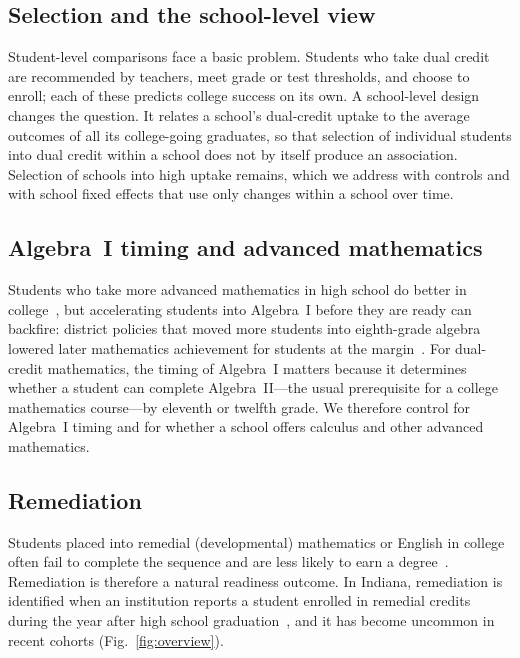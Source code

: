 \documentclass[aps,prd,reprint,superscriptaddress,nofootinbib,floatfix]{revtex4-2}
\begin{document}
\subsection{Selection and the school-level view}

Student-level comparisons face a basic problem. Students who take dual credit are recommended by teachers, meet grade or test thresholds, and choose to enroll; each of these predicts college success on its own. A school-level design changes the question. It relates a school's dual-credit uptake to the average outcomes of all its college-going graduates, so that selection of individual students into dual credit within a school does not by itself produce an association. Selection of schools into high uptake remains, which we address with controls and with school fixed effects that use only changes within a school over time.

\subsection{Algebra~I timing and advanced mathematics}

Students who take more advanced mathematics in high school do better in college~\cite{long2012}, but accelerating students into Algebra~I before they are ready can backfire: district policies that moved more students into eighth-grade algebra lowered later mathematics achievement for students at the margin~\cite{clotfelter2015,domina2015}. For dual-credit mathematics, the timing of Algebra~I matters because it determines whether a student can complete Algebra~II---the usual prerequisite for a college mathematics course---by eleventh or twelfth grade. We therefore control for Algebra~I timing and for whether a school offers calculus and other advanced mathematics.

\subsection{Remediation}

Students placed into remedial (developmental) mathematics or English in college often fail to complete the sequence and are less likely to earn a degree~\cite{bailey2010}. Remediation is therefore a natural readiness outcome. In Indiana, remediation is identified when an institution reports a student enrolled in remedial credits during the year after high school graduation~\cite{cheguide}, and it has become uncommon in recent cohorts (Fig.~\ref{fig:overview}).
\end{document}

